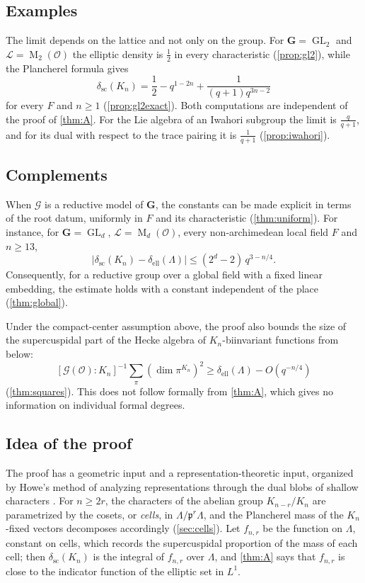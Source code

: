 \documentclass[11pt,reqno]{amsart}
\numberwithin{equation}{section}
\theoremstyle{plain}
\theoremstyle{definition}
\theoremstyle{remark}
\theoremstyle{plain}
\newcommand{\OO}{\mathcal{O}}    %
\newcommand{\pp}{\mathfrak{p}}   %
\newcommand{\Lat}{\mathcal{L}}   %
\newcommand{\dLat}{\Lambda}      %
\newcommand{\bG}{\mathbf{G}}     %
\newcommand{\g}{\mathfrak{g}}    %
\newcommand{\gd}{\mathfrak{g}^*} %
\newcommand{\scd}[1]{\delta_{\mathrm{sc}}(#1)}
\newcommand{\elld}[2][]{\delta_{\mathrm{ell}}^{#1}(#2)}  %
\newcommand{\cG}{\mathcal{G}}                   %
\DeclareMathOperator{\GL}{GL}
\DeclareMathOperator{\Mat}{M}
\begin{document}
\subsection{Examples}
The limit depends on the lattice and not only on the group. For
$\bG=\GL_2$ and $\Lat=\Mat_2(\OO)$ the elliptic density is $\frac12$ in
every characteristic (\cref{prop:gl2}), while the Plancherel formula gives
\[
\scd{K_n}=\frac12-q^{1-2n}+\frac1{(q+1)q^{3n-2}}
\]
for every $F$ and $n\ge1$ (\cref{prop:gl2exact}). Both computations are
independent of the proof of \cref{thm:A}. For the Lie algebra of an
Iwahori subgroup the limit is $\frac q{q+1}$, and for its dual with respect
to the trace pairing it is $\frac1{q+1}$ (\cref{prop:iwahori}).

\subsection{Complements}
When $\cG$ is a reductive model of $\bG$, the constants can be made
explicit in terms of the root datum, uniformly in $F$ and its
characteristic (\cref{thm:uniform}). For instance, for $\bG=\GL_d$,
$\Lat=\Mat_d(\OO)$, every non-archimedean local field $F$ and $n\ge13$,
\[
\bigl|\scd{K_n}-\elld{\dLat}\bigr|\le(2^d-2)\,q^{3-n/4}.
\]
Consequently, for a reductive group over a global field with a fixed
linear embedding, the estimate holds with a constant independent of the
place (\cref{thm:global}).

Under the compact-center assumption above, the proof also bounds the size of the supercuspidal part of the Hecke
algebra of $K_n$-biinvariant functions from below:
\[
[\cG(\OO):K_n]^{-1}\sum_{\pi}(\dim\pi^{K_n})^2\ge\elld{\dLat}-O(q^{-n/4})
\]
(\cref{thm:squares}). This does not follow formally from \cref{thm:A}, which gives
no information on individual formal degrees.

\subsection{Idea of the proof}
The proof has a geometric input and a representation-theoretic input,
organized by Howe's method of analyzing
representations through the dual blobs of shallow characters
\cite[\S2]{MR0492088}. For $n\ge2r$, the characters of the abelian group
$K_{n-r}/K_n$ are parametrized by the cosets, or \emph{cells}, in
$\dLat/\pp^r\dLat$, and the Plancherel mass of the $K_n$-fixed vectors
decomposes accordingly (\cref{sec:cells}). Let $f_{n,r}$ be the function on
$\dLat$, constant on cells, which records the supercuspidal proportion of
the mass of each cell; then $\scd{K_n}$ is the integral of $f_{n,r}$ over
$\dLat$, and \cref{thm:A} says that $f_{n,r}$ is close to the indicator
function of the elliptic set in $L^1$.
\end{document}
